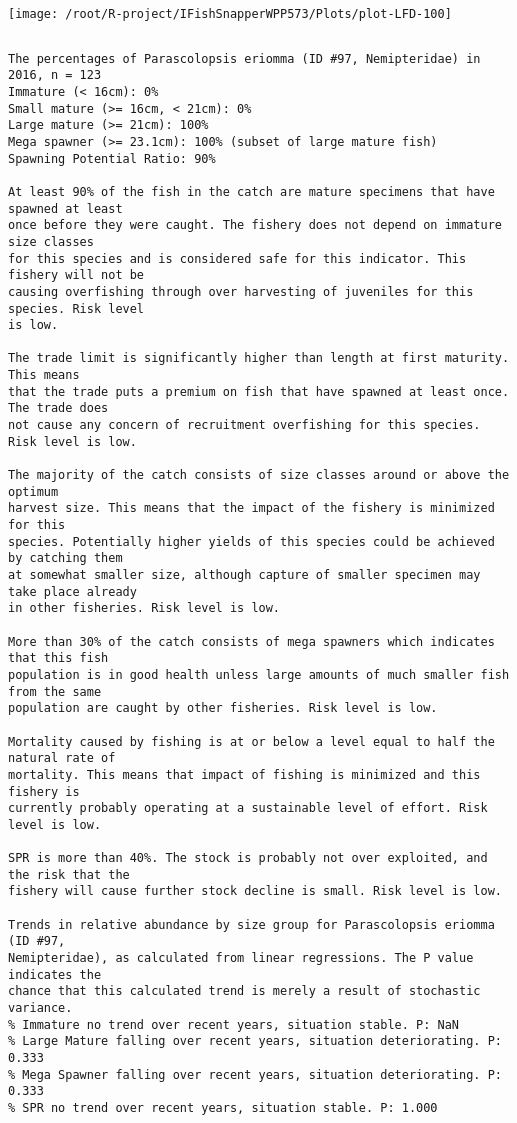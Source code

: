 \documentclass{report}\usepackage[]{graphicx}\usepackage[]{color}
\makeatletter
\def\maxwidth{ %
  \ifdim\Gin@nat@width>\linewidth
    \linewidth
  \else
    \Gin@nat@width
  \fi
}
\newenvironment{kframe}{%
 \def\at@end@of@kframe{}%
 \ifinner\ifhmode%
  \def\at@end@of@kframe{\end{minipage}}%
  \begin{minipage}{\columnwidth}%
 \fi\fi%
 \def\FrameCommand##1{\hskip\@totalleftmargin \hskip-\fboxsep
 \colorbox{shadecolor}{##1}\hskip-\fboxsep
     \hskip-\linewidth \hskip-\@totalleftmargin \hskip\columnwidth}%
 \MakeFramed {\advance\hsize-\width
   \@totalleftmargin\z@ \linewidth\hsize
   \@setminipage}}%
 {\par\unskip\endMakeFramed%
 \at@end@of@kframe}
\newenvironment{knitrout}{}{} %
\makeatother
\begin{document}
\begin{knitrout}
\texttt{[image: /root/R-project/IFishSnapperWPP573/Plots/plot-LFD-100]} 
\begin{kframe}\begin{verbatim}
\end{verbatim}
\end{kframe}
\clearpage
\newpage
\begin{kframe}\begin{verbatim}The percentages of Parascolopsis eriomma (ID #97, Nemipteridae) in 2016, n = 123
Immature (< 16cm): 0%
Small mature (>= 16cm, < 21cm): 0%
Large mature (>= 21cm): 100%
Mega spawner (>= 23.1cm): 100% (subset of large mature fish)
Spawning Potential Ratio: 90%
 
At least 90% of the fish in the catch are mature specimens that have spawned at least
once before they were caught. The fishery does not depend on immature size classes
for this species and is considered safe for this indicator. This fishery will not be
causing overfishing through over harvesting of juveniles for this species. Risk level
is low.

The trade limit is significantly higher than length at first maturity.  This means
that the trade puts a premium on fish that have spawned at least once. The trade does
not cause any concern of recruitment overfishing for this species. Risk level is low.

The majority of the catch consists of size classes around or above the optimum
harvest size. This means that the impact of the fishery is minimized for this
species. Potentially higher yields of this species could be achieved by catching them
at somewhat smaller size, although capture of smaller specimen may take place already
in other fisheries. Risk level is low.

More than 30% of the catch consists of mega spawners which indicates that this fish
population is in good health unless large amounts of much smaller fish from the same
population are caught by other fisheries. Risk level is low.
 
Mortality caused by fishing is at or below a level equal to half the natural rate of
mortality. This means that impact of fishing is minimized and this fishery is
currently probably operating at a sustainable level of effort. Risk level is low.
 
SPR is more than 40%. The stock is probably not over exploited, and the risk that the
fishery will cause further stock decline is small. Risk level is low.
 
Trends in relative abundance by size group for Parascolopsis eriomma (ID #97,
Nemipteridae), as calculated from linear regressions. The P value indicates the
chance that this calculated trend is merely a result of stochastic variance.
% Immature no trend over recent years, situation stable. P: NaN
% Large Mature falling over recent years, situation deteriorating. P: 0.333
% Mega Spawner falling over recent years, situation deteriorating. P: 0.333
% SPR no trend over recent years, situation stable. P: 1.000
\end{verbatim}
\end{kframe}
\end{knitrout}
\end{document}
